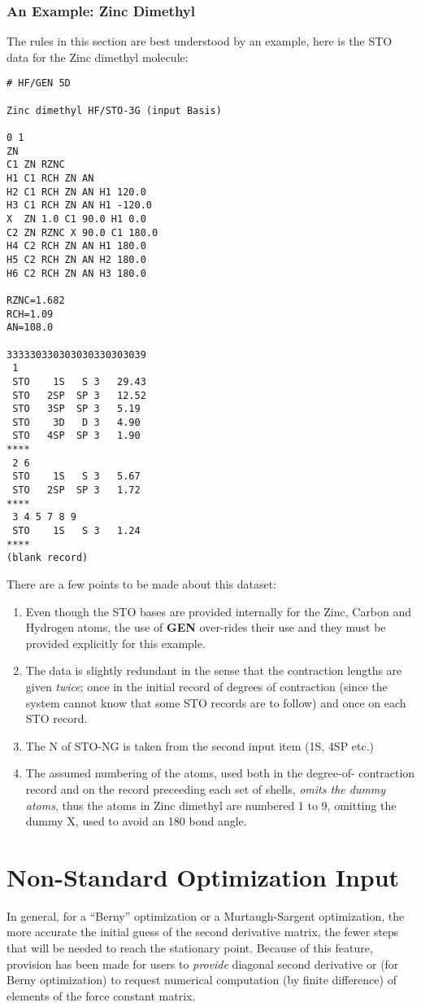 \subsubsection{\sf An Example: Zinc Dimethyl}
The rules in this section are best understood by an example, here is
the  STO data for the Zinc dimethyl molecule:
\begin{verbatim}
# HF/GEN 5D

Zinc dimethyl HF/STO-3G (input Basis)

0 1
ZN
C1 ZN RZNC
H1 C1 RCH ZN AN
H2 C1 RCH ZN AN H1 120.0
H3 C1 RCH ZN AN H1 -120.0
X  ZN 1.0 C1 90.0 H1 0.0
C2 ZN RZNC X 90.0 C1 180.0
H4 C2 RCH ZN AN H1 180.0
H5 C2 RCH ZN AN H2 180.0
H6 C2 RCH ZN AN H3 180.0

RZNC=1.682
RCH=1.09
AN=108.0

333330330303030330303039
 1
 STO    1S   S 3   29.43
 STO   2SP  SP 3   12.52
 STO   3SP  SP 3   5.19
 STO    3D   D 3   4.90
 STO   4SP  SP 3   1.90
****
 2 6
 STO    1S   S 3   5.67
 STO   2SP  SP 3   1.72
****
 3 4 5 7 8 9
 STO    1S   S 3   1.24
****
(blank record)
\end{verbatim}
\newpage
There are a few points to be made about this dataset:
\begin{enumerate}
\item Even though the STO bases are provided internally for the 
Zinc, Carbon
and Hydrogen atoms, the use of {\bf GEN} over-rides their use
and they must be provided explicitly for this example.
\item The data is slightly redundant in the sense that the contraction 
lengths are given {\em twice}; once in the initial record of
degrees of contraction (since the system cannot know that some STO
records are to follow) and once on each STO record.
\item The N of STO-NG is taken from the second input item (1S, 4SP etc.)
\item The assumed numbering of the atoms, used both in the degree-of-
contraction record and on the record preceeding each set of shells,
{\em omits the dummy atoms}, thus the atoms in Zinc dimethyl are
numbered 1 to 9, omitting the dummy X, used to avoid an 180 bond angle.
\end{enumerate}
\section{\sf Non-Standard Optimization Input}
In general, for a ``Berny''  optimization or a 
Murtaugh-Sargent
optimization, the more accurate the initial guess of the second
derivative matrix, the fewer steps that will be needed to reach the
stationary point. Because of this feature,  provision 
has been made for users
to {\em provide} diagonal second derivative or (for Berny optimization) to
request numerical computation (by finite difference) of elements of the
force constant matrix.

